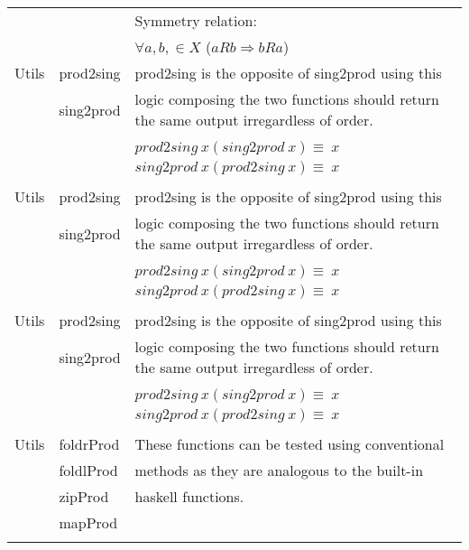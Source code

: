 \begin{center}
\begin{adjustwidth}{-2cm}{}
\begin{longtable}{ |m{1.8cm}|m{3.2cm}|m{9cm}| }
        \\ & & Symmetry relation:
        \\ & &
        $\forall a, b, \in X$ ($aRb \Rightarrow bRa$)
        \\ \hline
        Utils & prod2sing & prod2sing is the opposite of sing2prod using this \\
              & sing2prod  & logic composing the two functions should return 
              the same output irregardless of order. 
          \\  & &
          \\  & & $prod2sing\ x (sing2prod\ x) \equiv \ x$ 
          \\  & & $sing2prod\ x (prod2sing\ x) \equiv \ x$
          \\\hline
          & & \\
        Utils & prod2sing & prod2sing is the opposite of sing2prod using this \\
        & sing2prod  & logic composing the two functions should return 
        the same output irregardless of order. 
        \\  & &
        \\  & & $prod2sing\ x (sing2prod\ x) \equiv \ x$ 
        \\  & & $sing2prod\ x (prod2sing\ x) \equiv \ x$
        \\\hline
         & & \\
        Utils & prod2sing & prod2sing is the opposite of sing2prod using this \\
        & sing2prod  & logic composing the two functions should return 
        the same output irregardless of order. 
        \\  & &
        \\  & & $prod2sing\ x (sing2prod\ x) \equiv \ x$ 
        \\  & & $sing2prod\ x (prod2sing\ x) \equiv \ x$
        \\\hline
        & & \\
        Utils & foldrProd  &  These functions can be tested using conventional\\
              & foldlProd  & methods as they are analogous to the built-in\\
              & zipProd &  haskell functions.\\
              & mapProd & \\
        \\ \hline
        
        
\end{longtable}
\end{adjustwidth}
\end{center}

